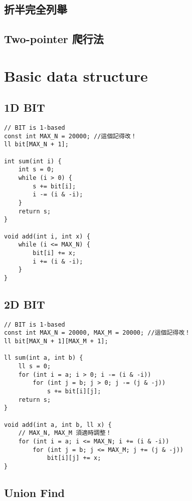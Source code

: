 \documentclass[10pt,oneside]{article}
\begin{document}
\begin{landscape}
\begin{multicols}{2}
\subsection{折半完全列舉}

\subsection{Two-pointer 爬行法}


\section{Basic data structure}

\subsection{1D BIT}

\begin{lstlisting}
// BIT is 1-based
const int MAX_N = 20000; //這個記得改！
ll bit[MAX_N + 1];

int sum(int i) {
    int s = 0;
    while (i > 0) {
        s += bit[i];
        i -= (i & -i);
    }
    return s;
}

void add(int i, int x) {
    while (i <= MAX_N) {
        bit[i] += x;
        i += (i & -i);
    }
}
\end{lstlisting}

\subsection{2D BIT}

\begin{lstlisting}
// BIT is 1-based
const int MAX_N = 20000, MAX_M = 20000; //這個記得改！
ll bit[MAX_N + 1][MAX_M + 1];

ll sum(int a, int b) {
    ll s = 0;
    for (int i = a; i > 0; i -= (i & -i))
        for (int j = b; j > 0; j -= (j & -j))
            s += bit[i][j];
    return s;
}

void add(int a, int b, ll x) {
	// MAX_N, MAX_M 須適時調整！
    for (int i = a; i <= MAX_N; i += (i & -i))
        for (int j = b; j <= MAX_M; j += (j & -j))
            bit[i][j] += x;
}
\end{lstlisting}

\subsection{Union Find}


\end{multicols}
\end{landscape}
\end{document}
